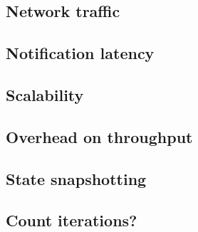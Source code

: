 \label {fs-acker-experiments}

\subsection{Network traffic}

\subsection{Notification latency}

\subsection{Scalability}

\subsection{Overhead on throughput}

\subsection{State snapshotting}

\subsection{Count iterations?}



